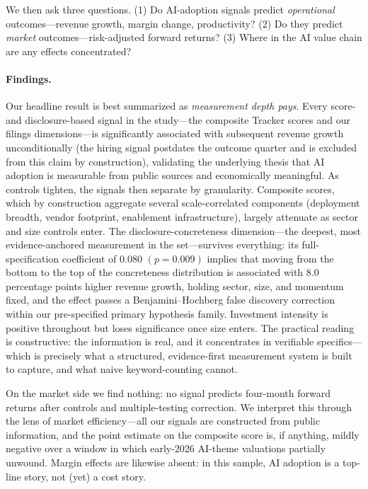 \documentclass[11pt]{article}
\newcommand{\coef}[1]{\ensuremath{#1}}
\newcommand{\pval}[1]{\ensuremath{(p=#1)}}
\begin{document}
We then ask three questions. (1) Do AI-adoption signals predict
\emph{operational} outcomes---revenue growth, margin change, productivity? (2)
Do they predict \emph{market} outcomes---risk-adjusted forward returns? (3)
Where in the AI value chain are any effects concentrated?

\paragraph{Findings.} Our headline result is best summarized as
\emph{measurement depth pays}. Every score- and disclosure-based signal in the study---the
composite Tracker scores and our filings dimensions---is
significantly associated with subsequent revenue growth unconditionally
(the hiring signal postdates the outcome quarter and is excluded from this
claim by construction),
validating the underlying thesis that AI adoption is measurable from public
sources and economically meaningful. As controls tighten, the signals then
separate by granularity. Composite scores, which by construction aggregate
several scale-correlated components (deployment breadth, vendor footprint,
enablement infrastructure), largely attenuate as sector and size controls enter. The disclosure-concreteness dimension---the
deepest, most evidence-anchored measurement in the set---survives everything:
its full-specification coefficient of \coef{0.080} \pval{0.009} implies that
moving from the bottom to the top of the concreteness distribution is
associated with 8.0 percentage points higher revenue growth, holding sector,
size, and momentum fixed, and the effect passes a Benjamini--Hochberg false
discovery correction within our pre-specified primary hypothesis family.
Investment intensity is positive throughout but loses significance once size
enters. The practical
reading is constructive: the information is real, and it concentrates in
verifiable specifics---which is precisely what a structured,
evidence-first measurement system is built to capture, and what naive
keyword-counting cannot.

On the market side we find nothing: no signal predicts four-month forward
returns after controls and multiple-testing correction. We interpret this
through the lens of market efficiency---all our signals are constructed from
public information, and the point estimate on the composite score is, if
anything, mildly negative over a window in which early-2026 AI-theme valuations
partially unwound. Margin effects are likewise absent: in this sample, AI
adoption is a top-line story, not (yet) a cost story.
\end{document}
